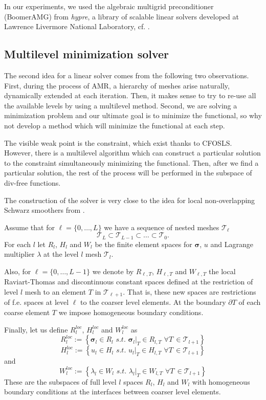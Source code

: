 \documentclass[a4paper,12pt]{amsart}
\numberwithin{equation}{section}
\newcommand{\T}{{\mathcal T}}
\def\bsigma{{\boldsymbol \sigma}}
\begin{document}
In our experiments, we used the algebraic multigrid preconditioner (BoomerAMG) from \emph{hypre}, a library of scalable linear solvers developed at Lawrence Livermore National Laboratory, cf. \cite{boomerAMG, hypre}.

\subsection{Multilevel minimization solver}

The second idea for a linear solver comes from the following two observations. First, during the process of AMR, a hierarchy of meshes arise naturally, dynamically extended at each iteration. Then, it makes sense to try to re-use all the available levels by using a multilevel method. Second, we are solving a minimization problem and our ultimate goal is to minimize the functional, so why not develop a method which will minimize the functional at each step.

The visible weak point is the constraint, which exist thanks to CFOSLS. However, there is a multilevel algorithm which can construct a particular solution to the constraint simultaneously minimizing the functional. Then, after we find a particular solution, the rest of the process will be performed in the subspace of div-free functions.

The construction of the solver is very close to the idea for local non-overlapping Schwarz smoothers from \cite{our_cfosls_paper}.

Assume that for $\ell=\{0, \dots, L\}$ we have a sequence of nested meshes $\mathcal{T}_{\ell}$
$$
\T_L \subset \T_{L-1} \subset \hdots \subset \T_0.
$$
For each $l$ let $R_{l}$, $H_l$ and $W_{l}$ be the finite element spaces for $\bsigma$, $u$ and Lagrange multiplier $\lambda$ at the level $l$ mesh $\mathcal{T}_l$. 

Also, for $\ell=\{0, \dots, L-1\}$ we denote by $R_{\ell,T}$, $H_{\ell,T}$ and $W_{\ell,T}$ the local Raviart-Thomas and discontinuous constant spaces defined at the restriction of level $l$ mesh to an element $T$ in $\mathcal{T}_{\ell + 1}$. That is, these new spaces are restrictions of f.e. spaces at level $\ell$ to the coarser level elements. At the boundary $\partial T$ of each coarse element $T$ we impose homogeneous boundary conditions.


Finally, let us define $R_{l}^{loc}$, $H_{l}^{loc}$ and $W_{l}^{loc}$ as
$$
R_{l}^{loc} := \left\{ \bsigma_l \in R_l \,\, s.t. \,\, \bsigma_l|_T \in R_{l,T} \, \, \forall T \, \in \T_{l+1} \right\}
$$
$$
H_{l}^{loc} := \left\{ u_l \in H_l \,\, s.t. \,\, u_l|_T \in H_{l,T} \, \, \forall T \, \in \T_{l+1} \right\}
$$
and
$$
W_{l}^{loc} := \left\{ \lambda_l \in W_l \,\, s.t. \,\, \lambda_l|_T \in W_{l,T} \, \, \forall T \, \in \T_{l+1} \right\}
$$
These are the subspaces of full level $l$ spaces $R_{l}$, $H_{l}$ and $W_{l}$ with homogeneous boundary conditions at the interfaces between coarser level elements. 
\end{document}
